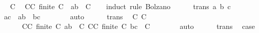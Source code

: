 \begin{isabellebody}
\ \ \isamarkupfalse%
\ C{\isacharparenleft}{\kern0pt}{}{\isacharcomma}{\kern0pt}{}{\isacharparenright}{\kern0pt}\ \isamarkupfalse%
\ {\isachardoublequoteopen}{\isasymexists}C{\isacharprime}{\kern0pt}{\isasymsubseteq}C{\isachardot}{\kern0pt}\ finite\ C{\isacharprime}{\kern0pt}\ {\isasymand}\ {\isacharbraceleft}{\kern0pt}a{\isachardot}{\kern0pt}{\isachardot}{\kern0pt}b{\isacharbraceright}{\kern0pt}\ {\isasymsubseteq}\ {\isasymUnion}C{\isacharprime}{\kern0pt}{\isachardoublequoteclose}\isanewline
\ \ \isamarkupfalse%
\ {\isacharparenleft}{\kern0pt}induct\ rule{\isacharcolon}{\kern0pt}\ Bolzano{\isacharparenright}{\kern0pt}\isanewline
\ \ \ \ \isamarkupfalse%
\ {\isacharparenleft}{\kern0pt}trans\ a\ b\ c{\isacharparenright}{\kern0pt}\isanewline
\ \ \ \ \isamarkupfalse%
\ \isamarkupfalse%
\ {\isacharasterisk}{\kern0pt}{\isacharcolon}{\kern0pt}\ {\isachardoublequoteopen}{\isacharbraceleft}{\kern0pt}a{\isachardot}{\kern0pt}{\isachardot}{\kern0pt}c{\isacharbraceright}{\kern0pt}\ {\isacharequal}{\kern0pt}\ {\isacharbraceleft}{\kern0pt}a{\isachardot}{\kern0pt}{\isachardot}{\kern0pt}b{\isacharbraceright}{\kern0pt}\ {\isasymunion}\ {\isacharbraceleft}{\kern0pt}b{\isachardot}{\kern0pt}{\isachardot}{\kern0pt}c{\isacharbraceright}{\kern0pt}{\isachardoublequoteclose}\isanewline
\ \ \ \ \ \ \isamarkupfalse%
\ auto\isanewline
\ \ \ \ \isamarkupfalse%
\ trans\ \isamarkupfalse%
\ C{}\ C{}\isanewline
\ \ \ \ \ \ \ {\isachardoublequoteopen}C{}{\isasymsubseteq}C{\isachardoublequoteclose}\ {\isachardoublequoteopen}finite\ C{}{\isachardoublequoteclose}\ {\isachardoublequoteopen}{\isacharbraceleft}{\kern0pt}a{\isachardot}{\kern0pt}{\isachardot}{\kern0pt}b{\isacharbraceright}{\kern0pt}\ {\isasymsubseteq}\ {\isasymUnion}C{}{\isachardoublequoteclose}\ {\isachardoublequoteopen}C{}{\isasymsubseteq}C{\isachardoublequoteclose}\ {\isachardoublequoteopen}finite\ C{}{\isachardoublequoteclose}\ {\isachardoublequoteopen}{\isacharbraceleft}{\kern0pt}b{\isachardot}{\kern0pt}{\isachardot}{\kern0pt}c{\isacharbraceright}{\kern0pt}\ {\isasymsubseteq}\ {\isasymUnion}C{}{\isachardoublequoteclose}\isanewline
\ \ \ \ \ \ \isamarkupfalse%
\ auto\isanewline
\ \ \ \ \isamarkupfalse%
\ trans\ \isamarkupfalse%
\ {\isacharquery}{\kern0pt}case\isanewline
\ \ \ \ \ \ \isamarkupfalse%

\end{isabellebody}
